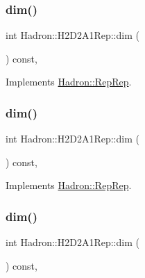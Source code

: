 \subsubsection{\texorpdfstring{dim()}{dim()}\hspace{0.1cm}{\footnotesize\ttfamily [3/5]}}
{\footnotesize\ttfamily int Hadron\+::\+H2\+D2\+A1\+Rep\+::dim (\begin{DoxyParamCaption}{ }\end{DoxyParamCaption}) const\hspace{0.3cm}{\ttfamily [inline]}, {\ttfamily [virtual]}}



Implements \mbox{\hyperlink{structHadron_1_1RepRep_a92c8802e5ed7afd7da43ccfd5b7cd92b}{Hadron\+::\+Rep\+Rep}}.

\mbox{\label{structHadron_1_1H2D2A1Rep_aad683d8986031b8f6a2b9e5ab83a5b17}} 
\subsubsection{\texorpdfstring{dim()}{dim()}\hspace{0.1cm}{\footnotesize\ttfamily [4/5]}}
{\footnotesize\ttfamily int Hadron\+::\+H2\+D2\+A1\+Rep\+::dim (\begin{DoxyParamCaption}{ }\end{DoxyParamCaption}) const\hspace{0.3cm}{\ttfamily [inline]}, {\ttfamily [virtual]}}



Implements \mbox{\hyperlink{structHadron_1_1RepRep_a92c8802e5ed7afd7da43ccfd5b7cd92b}{Hadron\+::\+Rep\+Rep}}.

\mbox{\label{structHadron_1_1H2D2A1Rep_aad683d8986031b8f6a2b9e5ab83a5b17}} 
\subsubsection{\texorpdfstring{dim()}{dim()}\hspace{0.1cm}{\footnotesize\ttfamily [5/5]}}
{\footnotesize\ttfamily int Hadron\+::\+H2\+D2\+A1\+Rep\+::dim (\begin{DoxyParamCaption}{ }\end{DoxyParamCaption}) const\hspace{0.3cm}{\ttfamily [inline]}, {\ttfamily [virtual]}}



